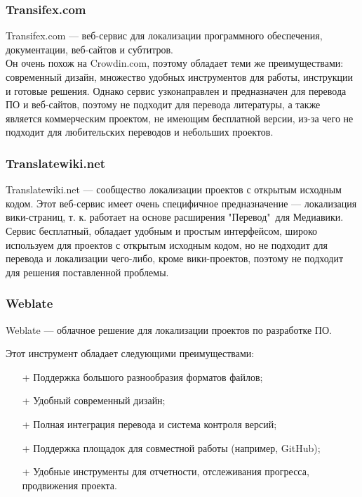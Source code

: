 \documentclass[a4paper,12pt]{article}
\begin{document}
\subsubsection{Transifex.com}

Transifex.com — веб-сервис для локализации программного обеспечения, документации, веб-сайтов и субтитров. \cite{website:transifex}\\
Он очень похож на Crowdin.com, поэтому обладает теми же преимуществами: современный дизайн, множество удобных инструментов для работы, инструкции и готовые решения. Однако сервис узконаправлен и предназначен для перевода ПО и веб-сайтов, поэтому не подходит для перевода литературы, а также является коммерческим проектом, не имеющим бесплатной версии, из-за чего не подходит для любительских переводов и небольших проектов.

\subsubsection{Translatewiki.net}

Translatewiki.net — сообщество локализации проектов с открытым исходным кодом. Этот веб-сервис имеет очень специфичное предназначение — локализация вики-страниц, т. к. работает на основе расширения "Перевод"\ для Медиавики. \cite{website:wiki}\\
Сервис бесплатный, обладает удобным и простым интерфейсом, широко используем для проектов с открытым исходным кодом, но не подходит для перевода и локализации чего-либо, кроме вики-проектов, поэтому не подходит для решения поставленной проблемы.

\subsubsection{Weblate}
Weblate — облачное решение для локализации проектов по разработке ПО. \cite{website:weblate}

Этот инструмент обладает следующими преимуществами:
\begin{itemize}
	\item[+] Поддержка большого разнообразия форматов файлов;
	\item[+] Удобный современный дизайн;
	\item[+] Полная интеграция перевода и система контроля версий;
	\item[+] Поддержка площадок для совместной работы (например, GitHub);
	\item[+] Удобные инструменты для отчетности, отслеживания прогресса, продвижения проекта.
\end{itemize}
\end{document}
